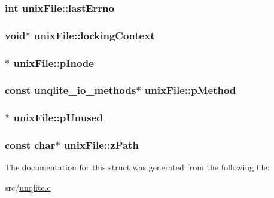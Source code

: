 \hypertarget{structunix_file_afde57c2e118fac8041918dac2ee6f7d1}{
\subsubsection[{last\-Errno}]{\setlength{\rightskip}{0pt plus 5cm}int unix\-File\-::last\-Errno}}\label{dd/d32/structunix_file_afde57c2e118fac8041918dac2ee6f7d1}
\hypertarget{structunix_file_afaeb4425a6de3e913db4b03e8a0d098a}{
\subsubsection[{locking\-Context}]{\setlength{\rightskip}{0pt plus 5cm}void$\ast$ unix\-File\-::locking\-Context}}\label{dd/d32/structunix_file_afaeb4425a6de3e913db4b03e8a0d098a}
\hypertarget{structunix_file_ac17292fe29bb6cc9eceed9db6d1209e8}{
\subsubsection[{p\-Inode}]{$\ast$ unix\-File\-::p\-Inode}}\label{dd/d32/structunix_file_ac17292fe29bb6cc9eceed9db6d1209e8}
\hypertarget{structunix_file_a322547d6028b2583ff0eb244717d970e}{
\subsubsection[{p\-Method}]{\setlength{\rightskip}{0pt plus 5cm}const {\bf unqlite\-\_\-io\-\_\-methods}$\ast$ unix\-File\-::p\-Method}}\label{dd/d32/structunix_file_a322547d6028b2583ff0eb244717d970e}
\hypertarget{structunix_file_a3820ccead5805d2ea61ca1c752646852}{
\subsubsection[{p\-Unused}]{$\ast$ unix\-File\-::p\-Unused}}\label{dd/d32/structunix_file_a3820ccead5805d2ea61ca1c752646852}
\hypertarget{structunix_file_afc5eff0948d553308cf90a79d4a06f17}{
\subsubsection[{z\-Path}]{\setlength{\rightskip}{0pt plus 5cm}const char$\ast$ unix\-File\-::z\-Path}}\label{dd/d32/structunix_file_afc5eff0948d553308cf90a79d4a06f17}


The documentation for this struct was generated from the following file\-:\begin{DoxyCompactItemize}
\item 
src/\hyperlink{unqlite_8c}{unqlite.\-c}\end{DoxyCompactItemize}
